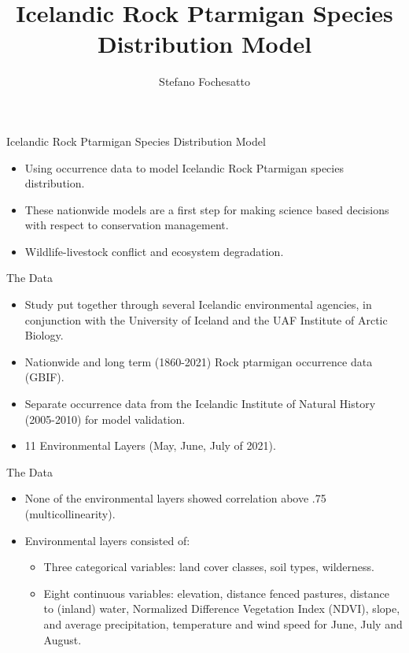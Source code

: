 \documentclass[10pt]{beamer}
\title{Icelandic Rock Ptarmigan Species Distribution Model}
\subtitle{}
\date{}
\author{Stefano Fochesatto}
\begin{document}
\maketitle


\begin{frame}{Icelandic Rock Ptarmigan Species Distribution Model}
    \begin{itemize}
        \item Using occurrence data to model Icelandic Rock Ptarmigan species distribution.
        \vfill
        \item These nationwide models are a first step for making science based decisions with respect to conservation management.
        \vfill
        \item Wildlife-livestock conflict and ecosystem degradation.  
    \end{itemize}
\end{frame}



\begin{frame}{The Data}
\begin{itemize}
    \item Study put together through several Icelandic environmental agencies, in conjunction with the University of Iceland and the UAF Institute of 
    Arctic Biology. 
    \vfill
    \item Nationwide and long term (1860-2021) Rock ptarmigan occurrence data (GBIF). 
    \vfill
    \item Separate occurrence data from the Icelandic Institute of Natural History (2005-2010) for model validation.
     \vfill
    \item 11 Environmental Layers (May, June, July of 2021).
\end{itemize}
\end{frame}


\begin{frame}{The Data}
    \begin{itemize}
        \item None of the environmental layers showed correlation above .75 (multicollinearity).
        \item Environmental layers consisted of:
        \begin{itemize}
            \item Three categorical variables: land cover classes, soil types, wilderness.
            \item Eight continuous variables: elevation, distance fenced pastures, distance to
            (inland) water, Normalized Difference Vegetation Index (NDVI), slope, and average
            precipitation, temperature and wind speed for June, July and August.
        \end{itemize}
    \end{itemize}
    \end{frame}
    
\end{document}
